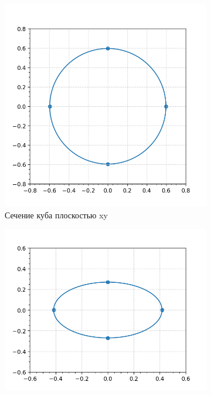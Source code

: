 \documentclass[a4paper,12pt]{article}
\begin{document}
\begin{itemize}
\begin{figure}[h!!]
            \begin{subfigure}{0.33\textwidth}
                \includegraphics[width=\linewidth, height=\linewidth]{kub.png}
                \caption*{Сечение куба плоскостью xy}
            \end{subfigure}
            \begin{subfigure}{0.33\textwidth}
                \includegraphics[width=\linewidth, height=\linewidth]{disc.png}

\end{subfigure}
\end{figure}
\end{itemize}
\end{document}
